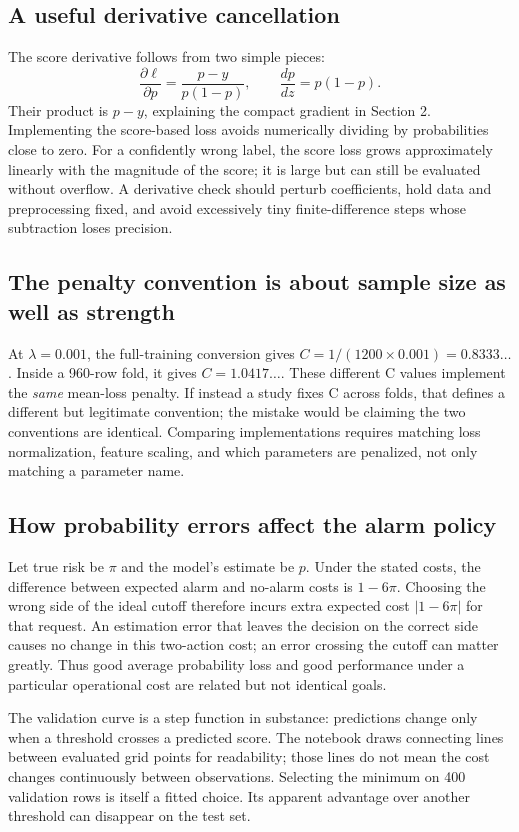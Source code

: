 \subsection*{A useful derivative cancellation}
The score derivative follows from two simple pieces:
\[\frac{\partial\ell}{\partial p}=\frac{p-y}{p(1-p)},\qquad
\frac{dp}{dz}=p(1-p).
\]
Their product is $p-y$, explaining the compact gradient in Section 2.
Implementing the score-based loss avoids numerically dividing by probabilities close to zero.
For a confidently wrong label, the score loss grows approximately linearly with the magnitude of the score;
it is large but can still be evaluated without overflow.
A derivative check should perturb coefficients, hold data and preprocessing fixed, and avoid excessively tiny
finite-difference steps whose subtraction loses precision.

\subsection*{The penalty convention is about sample size as well as strength}
At $\lambda=0.001$, the full-training conversion gives $C=1/(1200\times0.001)=0.8333\ldots$.
Inside a 960-row fold, it gives $C=1.0417\ldots$. These different C values implement the \emph{same}
mean-loss penalty. If instead a study fixes C across folds, that defines a different but legitimate convention;
the mistake would be claiming the two conventions are identical. Comparing implementations requires matching
loss normalization, feature scaling, and which parameters are penalized, not only matching a parameter name.

\subsection*{How probability errors affect the alarm policy}
Let true risk be $\pi$ and the model's estimate be $p$. Under the stated costs, the difference between
expected alarm and no-alarm costs is $1-6\pi$. Choosing the wrong side of the ideal cutoff therefore incurs
extra expected cost $|1-6\pi|$ for that request. An estimation error that leaves the decision on the correct
side causes no change in this two-action cost; an error crossing the cutoff can matter greatly.
Thus good average probability loss and good performance under a particular operational cost are related but not identical goals.

The validation curve is a step function in substance: predictions change only when a threshold crosses a predicted score.
The notebook draws connecting lines between evaluated grid points for readability; those lines do not mean the
cost changes continuously between observations. Selecting the minimum on 400 validation rows is itself a fitted
choice. Its apparent advantage over another threshold can disappear on the test set.

